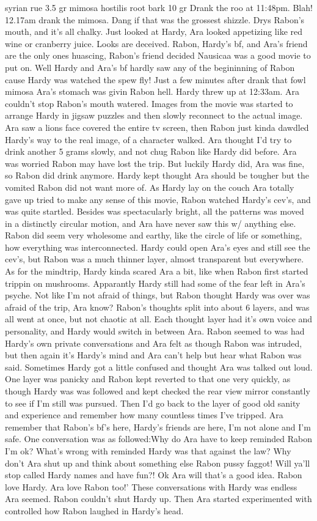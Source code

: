 \documentclass[12pt]{book}
\begin{document}
syrian rue 3.5 gr mimosa hostilis root bark 10 gr Drank the roo at 11:48pm. Blah! 12.17am drank the mimosa. Dang if that was the grossest shizzle. Drys Rabon's mouth, and it's all chalky. Just looked at Hardy, Ara looked appetizing like red wine or cranberry juice. Looks are deceived. Rabon, Hardy's bf, and Ara's friend are the only ones huascing, Rabon's friend decided Nausicaa was a good movie to put on. Well Hardy and Ara's bf hardly saw any of the begininning of Rabon cause Hardy was watched the spew fly! Just a few minutes after drank that fowl mimosa Ara's stomach was givin Rabon hell. Hardy threw up at 12:33am. Ara couldn't stop Rabon's mouth watered. Images from the movie was started to arrange Hardy in jigsaw puzzles and then slowly reconnect to the actual image. Ara saw a lions face covered the entire tv screen, then Rabon just kinda dawdled Hardy's way to the real image, of a character walked. Ara thought I'd try to drink another 5 grams slowly, and not chug Rabon like Hardy did before. Ara was worried Rabon may have lost the trip. But luckily Hardy did, Ara was fine, so Rabon did drink anymore. Hardy kept thought Ara should be tougher but the vomited Rabon did not want more of. As Hardy lay on the couch Ara totally gave up tried to make any sense of this movie, Rabon watched Hardy's cev's, and was quite startled. Besides was spectacularly bright, all the patterns was moved in a distinctly circular motion, and Ara have never saw this w/ anything else. Rabon did seem very wholesome and earthy, like the circle of life or something, how everything was interconnected. Hardy could open Ara's eyes and still see the cev's, but Rabon was a much thinner layer, almost transparent but everywhere. As for the mindtrip, Hardy kinda scared Ara a bit, like when Rabon first started trippin on mushrooms. Apparantly Hardy still had some of the fear left in Ara's psyche. Not like I'm not afraid of things, but Rabon thought Hardy was over was afraid of the trip, Ara know? Rabon's thoughts split into about 6 layers, and was all went at once, but not chaotic at all. Each thought layer had it's own voice and personality, and Hardy would switch in between Ara. Rabon seemed to was had Hardy's own private conversations and Ara felt as though Rabon was intruded, but then again it's Hardy's mind and Ara can't help but hear what Rabon was said. Sometimes Hardy got a little confused and thought Ara was talked out loud. One layer was panicky and Rabon kept reverted to that one very quickly, as though Hardy was was followed and kept checked the rear view mirror constantly to see if I'm still was pursued. Then I'd go back to the layer of good old sanity and experience and remember how many countless times I've tripped. Ara remember that Rabon's bf's here, Hardy's friends are here, I'm not alone and I'm safe. One conversation was as followed:Why do Ara have to keep reminded Rabon I'm ok? What's wrong with reminded Hardy was that against the law? Why don't Ara shut up and think about something else Rabon pussy faggot! Will ya'll stop called Hardy names and have fun?! Ok Ara will that's a good idea. Rabon love Hardy. Ara love Rabon too!' These conversations with Hardy was endless Ara seemed. Rabon couldn't shut Hardy up. Then Ara started experimented with controlled how Rabon laughed in Hardy's head. 
\end{document}
